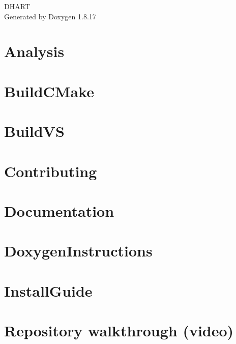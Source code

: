 \let\mypdfximage\pdfximage\def\pdfximage{\immediate\mypdfximage}\documentclass[twoside]{book}
\newcommand{\+}{\discretionary{\mbox{\scriptsize$\hookleftarrow$}}{}{}}
\newcommand{\clearemptydoublepage}{%
  \newpage{\pagestyle{empty}\cleardoublepage}%
}
\begin{document}
\hypersetup{pageanchor=false,
             bookmarksnumbered=true,
             pdfencoding=unicode
            }
\begin{titlepage}
\vspace*{7cm}
\begin{center}%
{\Large D\+H\+A\+RT }\\
\vspace*{1cm}
{\large Generated by Doxygen 1.8.17}\\
\end{center}
\end{titlepage}
\clearemptydoublepage
{}
\tableofcontents
\clearemptydoublepage
{}
\hypersetup{pageanchor=true}

\chapter{Analysis}
\label{index}\hypertarget{index}{}
\chapter{Build\+C\+Make}
\label{a02878}

\chapter{Build\+VS}
\label{a02879}

\chapter{Contributing}
\label{a02880}

\chapter{Documentation}
\label{a02881}

\chapter{Doxygen\+Instructions}
\label{a02882}

\chapter{Install\+Guide}
\label{a02883}

\chapter{Repository walkthrough (video)}
\label{a02884}

\end{document}
